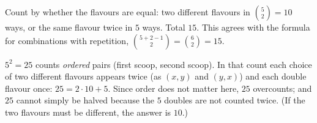 Count by whether the flavours are equal: two different flavours in $\binom52=10$ ways, or the same flavour twice in $5$ ways. Total $\boxed{15}$. This agrees with the formula for combinations with repetition, $\binom{5+2-1}{2}=\binom62=15$.

$5^2=25$ counts \emph{ordered} pairs (first scoop, second scoop). In that count each choice of two different flavours appears twice (as $(x,y)$ and $(y,x)$) and each double flavour once: $25=2\cdot10+5$. Since order does not matter here, $25$ overcounts; and $25$ cannot simply be halved because the $5$ doubles are not counted twice. (If the two flavours must be different, the answer is $10$.)
